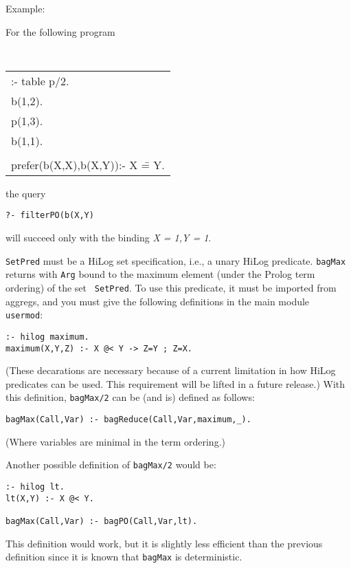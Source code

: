 \begin{description}
Example:

For the following program
     \begin{center}
     {\tt
     \begin{tabular}{l}
          :- table p/2.	\\
          b(1,2).       \\
          p(1,3).       \\
          b(1,1).       \\
\\
	  prefer(b(X,X),b(X,Y)):- X \== Y. 
     \end{tabular}
     }
     \end{center}
the query 
\begin{center}
{\tt ?- filterPO(b(X,Y)}
\end{center}
will succeed only with the binding {\em X = 1,Y = 1}.

    {\tt SetPred} must be a HiLog set specification, i.e., a unary
    HiLog predicate.  {\tt bagMax} returns with {\tt Arg} bound to the
    maximum element (under the Prolog term ordering) of the set {\tt
    SetPred}.  To use this predicate, it must be imported from aggregs,
    and you must give the following definitions in the main module {\tt
    usermod}:
\begin{verbatim}
:- hilog maximum.
maximum(X,Y,Z) :- X @< Y -> Z=Y ; Z=X.
\end{verbatim}
    (These decarations are necessary because of a current limitation in
    how HiLog predicates can be used.  This requirement will be lifted in
    a future release.)  With this definition, {\tt bagMax/2} can be (and
    is) defined as follows:
\begin{verbatim}
bagMax(Call,Var) :- bagReduce(Call,Var,maximum,_).
\end{verbatim}
    (Where variables are minimal in the term ordering.)

Another possible definition of {\tt bagMax/2} would be:
\begin{verbatim}
:- hilog lt.
lt(X,Y) :- X @< Y.

bagMax(Call,Var) :- bagPO(Call,Var,lt).
\end{verbatim}
This definition would work, but it is slightly less efficient than the
previous definition since it is known that {\tt bagMax} is
deterministic.



\end{description}
